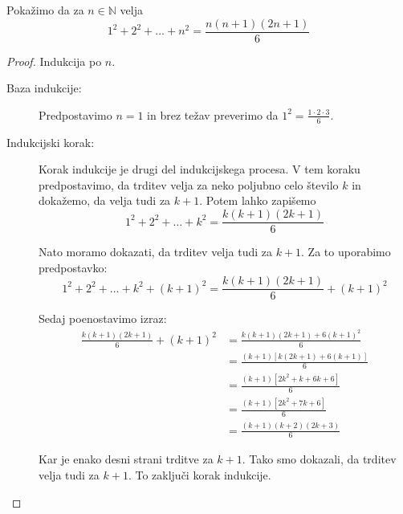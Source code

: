 \documentclass[11pt,paper=b5,DIV=13,headinclude,footinclude]{scrbook}
\newcounter{example}
\begin{document}
\begin{center}
\end{center}
\begin{example*}
    Pokažimo da za $n\in\mathbb N$ velja 
    $$1^2 + 2^2 + \ldots + n^2 = \frac{n(n+1)(2n+1)}{6}$$
\begin{proof}
    Indukcija po $n$. 
    \begin{description}
        \item[Baza  indukcije:] Predpostavimo  $n=1$ in brez  težav  preverimo da $1^2=\frac{1\cdot 2\cdot 3}{6}$.
        \item[Indukcijski korak:]
        Korak indukcije je drugi del indukcijskega procesa. V tem koraku predpostavimo, da trditev velja za neko poljubno celo število $k$ in dokažemo, da velja tudi za $k+1$.
        Potem lahko  zapišemo
\[
1^2 + 2^2 + \ldots + k^2 = \frac{k(k+1)(2k+1)}{6}
\]

Nato moramo dokazati, da trditev velja tudi za $k+1$. Za to uporabimo predpostavko:
\[
1^2 + 2^2 + \ldots + k^2 + (k+1)^2 = \frac{k(k+1)(2k+1)}{6} + (k+1)^2
\]

Sedaj poenostavimo izraz:
\begin{align*}
\frac{k(k+1)(2k+1)}{6} + (k+1)^2 &= \frac{k(k+1)(2k+1) + 6(k+1)^2}{6}\\
 &= \frac{(k+1)[k(2k+1) + 6(k+1)]}{6}\\
 &= \frac{(k+1)[2k^2+k+6k+6]}{6}\\
 &= \frac{(k+1)[2k^2+7k+6]}{6}\\
 &= \frac{(k+1)(k+2)(2k+3)}{6}
\end{align*}

Kar je enako desni strani trditve za $k+1$. Tako smo dokazali, da trditev velja tudi za $k+1$. To zaključi korak indukcije.
    \end{description}
\end{proof}

\end{example*}
\end{document}
